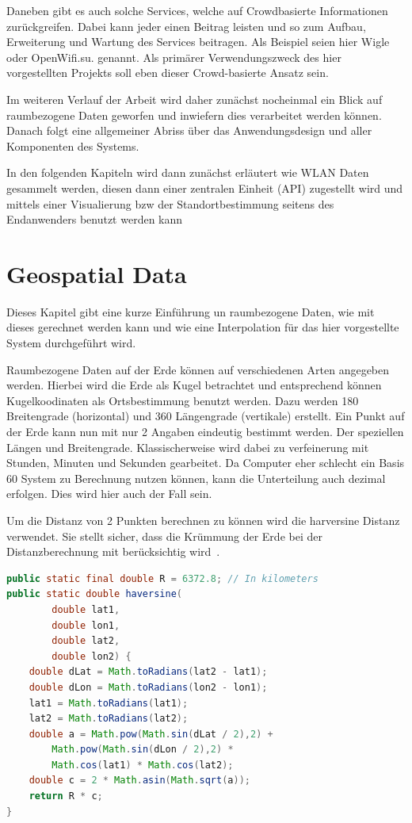 \documentclass[11pt,a4paper]{article}
\begin{document}
Daneben gibt es auch solche Services, welche auf Crowdbasierte Informationen zurückgreifen. Dabei kann jeder einen Beitrag leisten und so zum Aufbau, Erweiterung und Wartung des Services beitragen. Als Beispiel seien hier Wigle oder OpenWifi.su. genannt.
Als primärer Verwendungszweck des hier vorgestellten Projekts soll eben dieser Crowd-basierte Ansatz sein.

Im weiteren Verlauf der Arbeit wird daher zunächst nocheinmal ein Blick auf raumbezogene Daten geworfen und inwiefern dies verarbeitet werden können. Danach folgt eine allgemeiner Abriss über das Anwendungsdesign und aller Komponenten des Systems. 

In den folgenden Kapiteln wird dann zunächst erläutert wie WLAN Daten gesammelt werden, diesen dann einer zentralen Einheit (API) zugestellt wird und mittels einer Visualierung bzw der Standortbestimmung seitens des Endanwenders benutzt werden kann


\section{Geospatial Data}

Dieses Kapitel gibt eine kurze Einführung un raumbezogene Daten, wie mit dieses gerechnet werden kann und wie eine Interpolation für das hier vorgestellte System durchgeführt wird.

Raumbezogene Daten auf der Erde können auf verschiedenen Arten angegeben werden. Hierbei wird die Erde als Kugel betrachtet und entsprechend können Kugelkoodinaten als Ortsbestimmung benutzt werden. Dazu werden 180 Breitengrade (horizontal) und 360 Längengrade (vertikale) erstellt. Ein Punkt auf der Erde kann nun mit nur 2 Angaben eindeutig bestimmt werden. Der speziellen Längen und Breitengrade. Klassischerweise wird dabei zu verfeinerung mit Stunden, Minuten und Sekunden gearbeitet. Da Computer eher schlecht ein Basis 60 System zu Berechnung nutzen können, kann die Unterteilung auch dezimal erfolgen. Dies wird hier auch der Fall sein. 

Um die Distanz von 2 Punkten berechnen zu können wird die harversine Distanz verwendet. Sie stellt sicher, dass die Krümmung der Erde bei der Distanzberechnung mit berücksichtig wird~\cite{harversine_distance}.

\begin{lstlisting}[language=Java]
public static final double R = 6372.8; // In kilometers
public static double haversine(
		double lat1, 
		double lon1, 
		double lat2, 
		double lon2) {
    double dLat = Math.toRadians(lat2 - lat1);
    double dLon = Math.toRadians(lon2 - lon1);
    lat1 = Math.toRadians(lat1);
    lat2 = Math.toRadians(lat2);
    double a = Math.pow(Math.sin(dLat / 2),2) +
    	Math.pow(Math.sin(dLon / 2),2) * 
    	Math.cos(lat1) * Math.cos(lat2);
    double c = 2 * Math.asin(Math.sqrt(a));
    return R * c;
}
\end{lstlisting}
\end{document}
